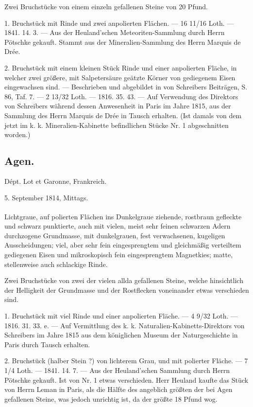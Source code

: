 \documentclass[a4paper, 11pt, oneside, polutonikogreek, german]{article}
\begin{document}
Zwei Bruchstücke von einem einzeln gefallenen Steine von 20 Pfund.

1. Bruchstück mit Rinde und zwei anpolierten Flächen. — 16 11/16 Loth. — 1841. 14. 3. — Aus der Heuland'schen Meteoriten-Sammlung durch Herrn Pötschke gekauft. Stammt aus der Mineralien-Sammlung des Herrn Marquis de Drée.

2. Bruchstück mit einem kleinen Stück Rinde und einer anpolierten Fläche, in welcher zwei größere, mit Salpetersäure geätzte Körner von gediegenem Eisen eingewachsen sind. — Beschrieben und abgebildet in von Schreibers Beiträgen, S. 86, Taf. 7. — 2 13/32 Loth. — 1816. 35. 43. — Auf Verwendung des Direktors von Schreibers während dessen Anwesenheit in Paris im Jahre 1815, aus der Sammlung des Herrn Marquis de Drée in Tausch erhalten. (Ist damals von dem jetzt im k. k. Mineralien-Kabinette befindlichen Stücke Nr. 1 abgeschnitten worden.)
\subsection{Agen.}
\begin{center}
\small
Dépt. Lot et Garonne, Frankreich.

5. September 1814, Mittags.
\end{center}
\paragraph{}
Lichtgraue, auf polierten Flächen ins Dunkelgraue ziehende, rostbraun gefleckte und schwarz punktierte, auch mit vielen, meist sehr feinen schwarzen Adern durchzogene Grundmasse, mit dunkelgrauen, fest verwachsenen, kugeligen Ausscheidungen; viel, aber sehr fein eingesprengtem und gleichmäßig verteiltem gediegenen Eisen und mikroskopisch fein eingesprengtem Magnetkies; matte, stellenweise auch schlackige Rinde.

Zwei Bruchstücke von zwei der vielen allda gefallenen Steine, welche hinsichtlich der Helligkeit der Grundmasse und der Rostflecken voneinander etwas verschieden sind.

1. Bruchstück mit viel Rinde und einer anpolierten Fläche. — 4 9/32 Loth. — 1816. 31. 33. e. — Auf Vermittlung des k. k. Naturalien-Kabinetts-Direktors von Schreibers im Jahre 1815 aus dem königlichen Museum der Naturgeschichte in Paris durch Tausch erhalten.

2. Bruchstück (halber Stein ?) von lichterem Grau, und mit polierter Fläche. — 7 1/4 Loth. — 1841. 14. 7. — Aus der Heuland'schen Sammlung durch Herrn Pötschke gekauft. Ist von Nr. 1 etwas verschieden. Herr Heuland kaufte das Stück von Herrn Leman in Paris, als die Hälfte des angeblich größten der bei Agen gefallenen Steine, was jedoch unrichtig ist, da der größte 18 Pfund wog.
\end{document}
